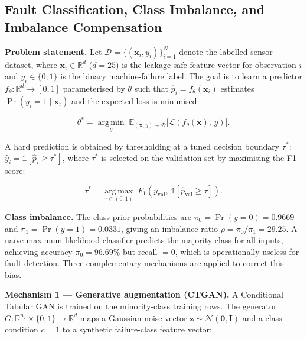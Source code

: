 \documentclass[sensors,article,submit,pdftex,moreauthors]{Definitions/mdpi}
\begin{document}
\subsection{Fault Classification, Class Imbalance, and Imbalance
Compensation}

\textbf{Problem statement.}
Let $\mathcal{D} = \{(\mathbf{x}_i, y_i)\}_{i=1}^{N}$ denote the
labelled sensor dataset, where
$\mathbf{x}_i \in \mathbb{R}^{d}$ ($d = 25$) is the leakage-safe
feature vector for observation $i$ and $y_i \in \{0, 1\}$ is the
binary machine-failure label.
The goal is to learn a predictor
$f_\theta: \mathbb{R}^{d} \to [0,1]$ parameterised by $\theta$
such that $\hat{p}_i = f_\theta(\mathbf{x}_i)$ estimates
$\Pr(y_i = 1 \mid \mathbf{x}_i)$ and the expected loss is minimised:

\begin{linenomath}
\begin{equation}
\theta^* = \operatorname*{arg\,min}_{\theta}\;
  \mathbb{E}_{(\mathbf{x},y)\sim\mathcal{D}}
  \bigl[\mathcal{L}\!\left(f_\theta(\mathbf{x}),\,y\right)\bigr].
\label{eq:objective}
\end{equation}
\end{linenomath}

\noindent A hard prediction is obtained by thresholding at a
tuned decision boundary $\tau^*$:
$\hat{y}_i = \mathbb{1}[\hat{p}_i \geq \tau^*]$,
where $\tau^*$ is selected on the validation set by maximising the
F1-score:

\begin{linenomath}
\begin{equation}
\tau^* = \operatorname*{arg\,max}_{\tau \in (0,1)}\;
  F_1\!\left(y_\text{val},\,
  \mathbb{1}[\hat{p}_\text{val} \geq \tau]\right).
\label{eq:threshold}
\end{equation}
\end{linenomath}

\textbf{Class imbalance.}
The class prior probabilities are $\pi_0 = \Pr(y{=}0) = 0.9669$
and $\pi_1 = \Pr(y{=}1) = 0.0331$, giving an imbalance ratio
$\rho = \pi_0/\pi_1 = 29.25$.
A naïve maximum-likelihood classifier predicts the majority class
for all inputs, achieving accuracy $\pi_0 = 96.69\%$ but recall
$= 0$, which is operationally useless for fault detection.
Three complementary mechanisms are applied to correct this bias.

\textbf{Mechanism 1 — Generative augmentation (CTGAN).}
A Conditional Tabular GAN \citep{ref-ctgan-original} is trained on
the minority-class training rows.
The generator $G: \mathbb{R}^{n_z} \times \{0,1\} \to \mathbb{R}^d$
maps a Gaussian noise vector $\mathbf{z} \sim \mathcal{N}(\mathbf{0},
\mathbf{I})$ and a class condition $c = 1$ to a synthetic
failure-class feature vector:
\end{document}
